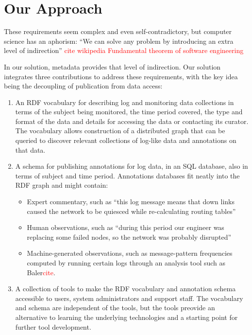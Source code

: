 \section{Our Approach}
\label{s:solution}

These requirements seem complex and even self-contradictory, but
computer science has an aphorism: ``We can solve any problem by
introducing an extra level of indirection''
 \textcolor{red}{cite wikipedia Fundamental theorem of software engineering}

In our solution, metadata provides that level of indirection. 
Our solution integrates three contributions to address these 
requirements, with the key idea being the decoupling of publication 
from data access:

\begin{enumerate}
\item An RDF vocabulary for describing log and monitoring data collections
      in terms of the subject being monitored, the time period covered,
      the type and format of the data and details for accessing the data or
      contacting its curator. The vocabulary allows construction of a 
      distributed graph that can be queried to discover relevant collections
      of log-like data and annotations on that data.
      
\item A schema for publishing annotations for log data, in an SQL
	  database, also in terms of subject and time period. Annotations 
      databases fit neatly into the RDF graph and might contain:
      
\begin{itemize}
\item Expert commentary, such as ``this log message means that down links
      caused the network to be quiesced while re-calculating routing tables''      
\item Human observations, such as ``during this period our engineer was 
      replacing some failed nodes, so the network was probably disrupted'' 
\item Machine-generated observations, such as message-pattern frequencies 
      computed by running certain logs through an analysis tool such as 
      Baler\textcolor{red}{cite}.
\end{itemize}

\item A collection of tools to make the RDF vocabulary and annotation 
      schema accessible to users, system administrators and support staff.
      The vocabulary and schema are independent of the tools, but 
      the tools preovide an alternative to learning the underlying 
      technologies and a starting point for further tool development.

\end{enumerate}









